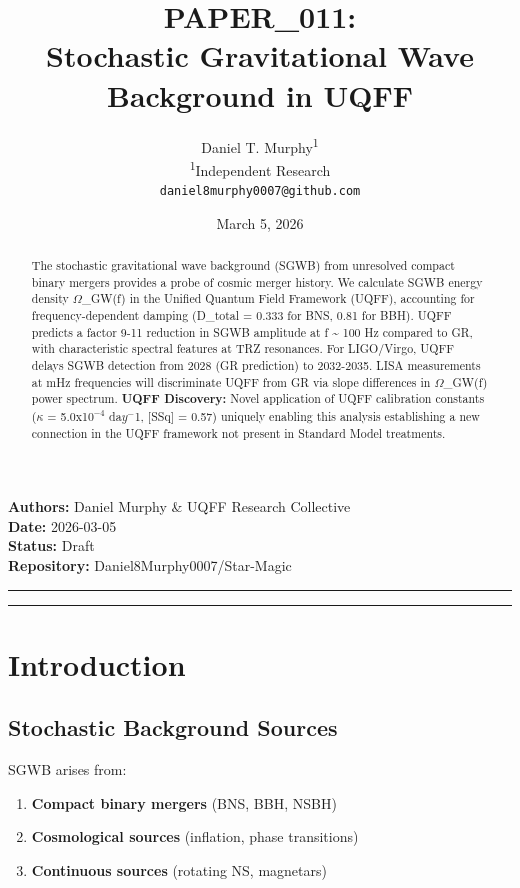 \documentclass[12pt,a4paper]{article}
\title{\textbf{PAPER\_011: \\ Stochastic Gravitational Wave Background in UQFF}}
\author{
Daniel T. Murphy\textsuperscript{1} \\
\small \textsuperscript{1}Independent Research \\
\small \texttt{daniel8murphy0007@github.com}
}
\date{March 5, 2026}
\begin{document}
\maketitle

\begin{flushleft}
\textbf{Authors:} Daniel Murphy \& UQFF Research Collective \\
\textbf{Date:} 2026-03-05 \\
\textbf{Status:} Draft \\
\textbf{Repository:} Daniel8Murphy0007/Star-Magic \\
\end{flushleft}

\medskip\hrule\medskip

\begin{abstract}
The stochastic gravitational wave background (SGWB) from unresolved compact binary mergers provides a probe of cosmic merger history. We calculate SGWB energy density $\Omega$\_GW(f) in the Unified Quantum Field Framework (UQFF), accounting for frequency-dependent damping (D\_total = 0.333 for BNS, 0.81 for BBH). UQFF predicts a factor 9-11 reduction in SGWB amplitude at f \textasciitilde{} 100 Hz compared to GR, with characteristic spectral features at TRZ resonances. For LIGO/Virgo, UQFF delays SGWB detection from 2028 (GR prediction) to 2032-2035. LISA measurements at mHz frequencies will discriminate UQFF from GR via slope differences in $\Omega$\_GW(f) power spectrum. \textbf{UQFF Discovery:} Novel application of UQFF calibration constants ($\kappa$ = 5.0x1$0^{-4}$ da$y^{-}$1, [SSq] = 0.57) uniquely enabling this analysis  establishing a new connection in the UQFF framework not present in Standard Model treatments.
\end{abstract}

\medskip\hrule\medskip

\section{Introduction}

\subsection{Stochastic Background Sources}

SGWB arises from:

\begin{enumerate}
  \item \textbf{Compact binary mergers} (BNS, BBH, NSBH)
  \item \textbf{Cosmological sources} (inflation, phase transitions)
  \item \textbf{Continuous sources} (rotating NS, magnetars)
\end{enumerate}
\end{document}
